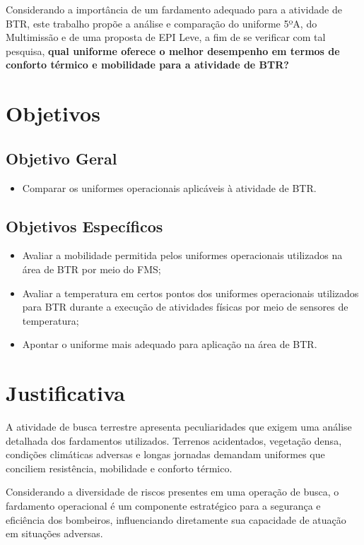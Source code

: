 		Considerando a importância de um fardamento adequado para a atividade de \acrshort{BTR}, este trabalho propõe a análise e comparação do
	 	uniforme 5ºA, do Multimissão e de uma proposta de EPI Leve, a fim de se verificar com tal pesquisa, \textbf{qual uniforme oferece o melhor desempenho 
	 	em termos de conforto térmico e mobilidade para a atividade de \acrlong{BTR}?}

	\section{Objetivos}

		\subsection{Objetivo Geral}
			\begin{itemize}
				\item Comparar os uniformes operacionais aplicáveis à atividade de \acrlong{BTR}.
			\end{itemize}
		\subsection{Objetivos Específicos}
			\begin{itemize}
				\item Avaliar a mobilidade permitida pelos uniformes operacionais utilizados na área de \acrlong{BTR} por meio do \acrfull{FMS};
				\item Avaliar a temperatura em certos pontos dos uniformes operacionais utilizados para \acrlong{BTR} durante a execução de atividades físicas por meio de sensores de temperatura;
				\item Apontar o uniforme mais adequado para aplicação na área de \acrlong{BTR}.
			\end{itemize}
\section{Justificativa}
	
	A atividade de busca terrestre apresenta peculiaridades que exigem uma análise detalhada dos 
	fardamentos utilizados. Terrenos acidentados, vegetação densa, condições climáticas adversas 
	e longas jornadas demandam uniformes que conciliem resistência, mobilidade e conforto térmico.
	
	Considerando a diversidade de riscos presentes em uma operação de busca, o fardamento operacional é um componente estratégico para
	 a segurança e eficiência dos bombeiros, influenciando diretamente sua capacidade de atuação em situações adversas.
	
